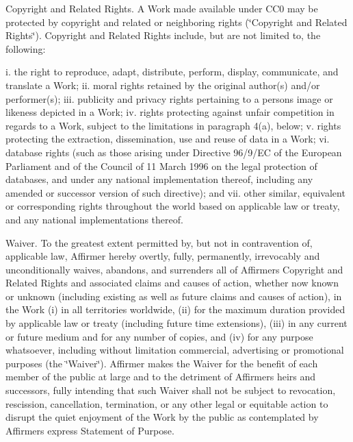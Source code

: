 \begin{DoxyEnumerate}
\item Copyright and Related Rights. A Work made available under C\+C0 may be protected by copyright and related or neighboring rights (\char`\"{}\+Copyright and
\+Related Rights\char`\"{}). Copyright and Related Rights include, but are not limited to, the following\+:

i. the right to reproduce, adapt, distribute, perform, display, communicate, and translate a Work; ii. moral rights retained by the original author(s) and/or performer(s); iii. publicity and privacy rights pertaining to a person\textquotesingle{}s image or likeness depicted in a Work; iv. rights protecting against unfair competition in regards to a Work, subject to the limitations in paragraph 4(a), below; v. rights protecting the extraction, dissemination, use and reuse of data in a Work; vi. database rights (such as those arising under Directive 96/9/\+EC of the European Parliament and of the Council of 11 March 1996 on the legal protection of databases, and under any national implementation thereof, including any amended or successor version of such directive); and vii. other similar, equivalent or corresponding rights throughout the world based on applicable law or treaty, and any national implementations thereof.
\item Waiver. To the greatest extent permitted by, but not in contravention of, applicable law, Affirmer hereby overtly, fully, permanently, irrevocably and unconditionally waives, abandons, and surrenders all of Affirmer\textquotesingle{}s Copyright and Related Rights and associated claims and causes of action, whether now known or unknown (including existing as well as future claims and causes of action), in the Work (i) in all territories worldwide, (ii) for the maximum duration provided by applicable law or treaty (including future time extensions), (iii) in any current or future medium and for any number of copies, and (iv) for any purpose whatsoever, including without limitation commercial, advertising or promotional purposes (the \char`\"{}\+Waiver\char`\"{}). Affirmer makes the Waiver for the benefit of each member of the public at large and to the detriment of Affirmer\textquotesingle{}s heirs and successors, fully intending that such Waiver shall not be subject to revocation, rescission, cancellation, termination, or any other legal or equitable action to disrupt the quiet enjoyment of the Work by the public as contemplated by Affirmer\textquotesingle{}s express Statement of Purpose.

\end{DoxyEnumerate}
